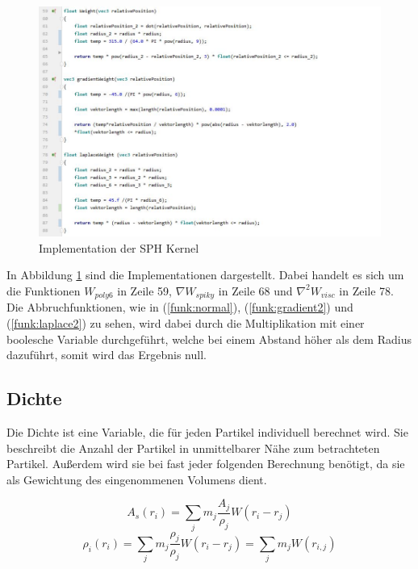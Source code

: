 \documentclass[intern,palatino]{cgBA}
\begin{document}
\begin{figure}[H]
	\centering
	\includegraphics[width=1.35\columnwidth]{Bilder/impKernel.jpg}
	\caption{Implementation der SPH Kernel}
	\label{img:impkernel}
\end{figure}

In Abbildung \ref{img:impkernel} sind die Implementationen dargestellt. Dabei handelt es sich um die Funktionen $W_{poly6}$ in Zeile 59, $\nabla W_{spiky}$ in Zeile 68 und $\nabla^2 W_{visc}$ in Zeile 78.\newline
Die Abbruchfunktionen, wie in (\ref{funk:normal}), (\ref{funk:gradient2}) und (\ref{funk:laplace2}) zu sehen, wird dabei durch die Multiplikation mit einer boolesche Variable durchgeführt, welche bei einem Abstand höher als dem Radius dazuführt, somit wird das Ergebnis null.


\subsection{Dichte}\label{dichte}

Die Dichte ist eine Variable, die für jeden Partikel individuell berechnet wird. Sie beschreibt die Anzahl der Partikel in unmittelbarer Nähe zum betrachteten Partikel. Außerdem wird sie bei fast jeder folgenden Berechnung benötigt, da sie als Gewichtung des eingenommenen Volumens dient. 

\begin{equation}\label{funk:skalar}
A_s(r_i) = \sum_j m_j \frac{A_j}{\rho_j} W(r_i-r_j)
\end{equation}
\begin{equation}\label{funk:density}
\rho_i(r_i) = \sum_j m_j \frac{\rho_j}{\rho_j} W(r_i-r_j) = \sum_j m_j  W(r_{i,j})
\end{equation}
\end{document}
